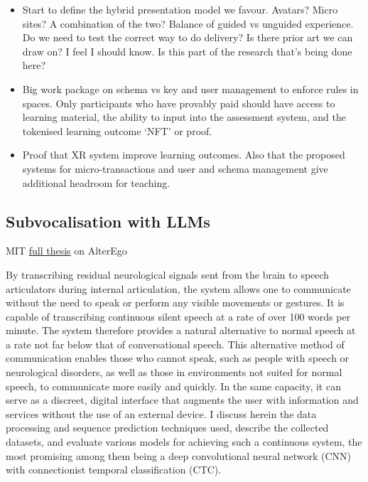 \begin{itemize}
\item Start to define the hybrid presentation model we favour. Avatars? Micro sites? A combination of the two? Balance of guided vs unguided experience. Do we need to test the correct way to do delivery? Is there prior art we can draw on? I feel I should know. Is this part of the research that's being done here?
\item Big work package on schema vs key and user management to enforce rules in spaces. Only participants who have provably paid should have access to learning material, the ability to input into the assessment system, and the tokenised learning outcome `NFT' or proof.
\item Proof that XR system improve learning outcomes. Also that the proposed systems for micro-transactions and user and schema management give additional headroom for teaching.
\end{itemize}
\subsection{Subvocalisation with LLMs}
MIT \href{https://dspace.mit.edu/handle/1721.1/123121}{full thesis} on AlterEgo
\begin{tcolorbox}[enhanced, frame style={fill=lightgray}, interior style={fill=lightgray}]
By transcribing residual neurological signals sent from the brain to speech articulators during internal articulation, the system allows one to communicate without the need to speak or perform any visible movements or gestures. It is capable of transcribing continuous silent speech at a rate of over 100 words per minute. The system therefore provides a natural alternative to normal speech at a rate not far below that of conversational speech. This alternative method of communication enables those who cannot speak, such as people with speech or neurological disorders, as well as those in environments not suited for normal speech, to communicate more easily and quickly. In the same capacity, it can serve as a discreet, digital interface that augments the user with information and services without the use of an external device. I discuss herein the data processing and sequence prediction techniques used, describe the collected datasets, and evaluate various models for achieving such a continuous system, the most promising among them being a deep convolutional neural network (CNN) with connectionist temporal classification (CTC).
\end{tcolorbox}
